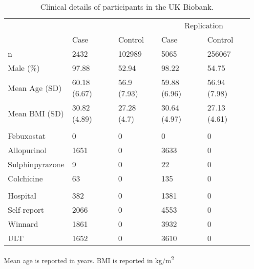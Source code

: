\documentclass[]{report}
\begin{document}
\begin{table}[!h]

\caption{\label{tab:unnamed-chunk-6}\label{tab:ukbbclin} Clinical details of participants in the UK Biobank.}
\centering
\begin{threeparttable}
\begin{tabular}[t]{lllll}
\toprule
\multicolumn{1}{c}{} & \multicolumn{1}{c}{} & \multicolumn{1}{c}{} & \multicolumn{2}{c}{Replication} \\
\cmidrule(l{2pt}r{2pt}){4-5}
 & Case & Control & Case & Control\\
\midrule
n & 2432 & 102989 & 5065 & 256067\\
Male (\%) & 97.88 & 52.94 & 98.22 & 54.75\\
Mean Age (SD) & 60.18 (6.67) & 56.9 (7.93) & 59.88 (6.96) & 56.94 (7.98)\\
Mean BMI (SD) & 30.82 (4.89) & 27.28 (4.7) & 30.64 (4.97) & 27.13 (4.61)\\
\addlinespace[0.3em]
\multicolumn{5}{l}{\textbf{Gout medication}}\\
\hspace{1em}Febuxostat & 0 & 0 & 0 & 0\\
\hspace{1em}Allopurinol & 1651 & 0 & 3633 & 0\\
\hspace{1em}Sulphinpyrazone & 9 & 0 & 22 & 0\\
\hspace{1em}Colchicine & 63 & 0 & 135 & 0\\
\addlinespace[0.3em]
\multicolumn{5}{l}{\textbf{Gout classification}}\\
\hspace{1em}Hospital & 382 & 0 & 1381 & 0\\
\hspace{1em}Self-report & 2066 & 0 & 4553 & 0\\
\hspace{1em}Winnard & 1861 & 0 & 3932 & 0\\
\hspace{1em}ULT & 1652 & 0 & 3610 & 0\\
\bottomrule
\end{tabular}
\begin{tablenotes}
\item Mean age is reported in years. BMI is reported in kg/m\textsuperscript{2}
\end{tablenotes}
\end{threeparttable}
\end{table}
\end{document}
